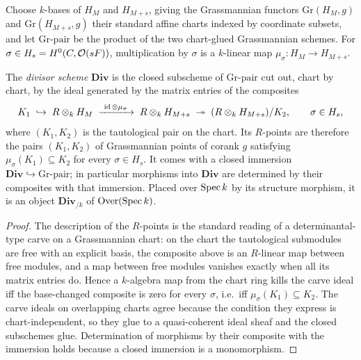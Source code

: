 \begin{definition}
  \label{pa-def:divScheme}
  \leanok

  Choose \(k\)-bases of \(H_M\) and \(H_{M+s}\), giving the Grassmannian functors
  \(\mathrm{Gr}(H_M, g)\) and \(\mathrm{Gr}(H_{M+s}, g)\) their standard affine charts
  indexed by coordinate subsets, and let \(\mathrm{Gr}\text{-pair}\) be the product of the
  two chart-glued Grassmannian schemes. For \(\sigma \in H_s = H^0(C, \mathcal{O}(sF))\), multiplication
  by \(\sigma\) is a \(k\)-linear map \(\mu_\sigma \colon H_M \to H_{M+s}\).

  The \emph{divisor scheme} \(\mathbf{Div}\) is the closed subscheme of
  \(\mathrm{Gr}\text{-pair}\) cut out, chart by chart, by the ideal generated by the matrix
  entries of the composites
  \[
    K_1 \;\hookrightarrow\; R \otimes_k H_M \;\xrightarrow{\ \operatorname{id} \otimes \mu_\sigma\ }\;
      R \otimes_k H_{M+s} \;\twoheadrightarrow\; (R \otimes_k H_{M+s})/K_2 ,
    \qquad \sigma \in H_s ,
  \]
  where \((K_1, K_2)\) is the tautological pair on the chart. Its \(R\)-points are therefore
  the pairs \((K_1, K_2)\) of Grassmannian points of corank \(g\) satisfying
  \(\mu_\sigma(K_1) \subseteq K_2\) for every \(\sigma \in H_s\). It comes with a closed
  immersion \(\mathbf{Div} \hookrightarrow \mathrm{Gr}\text{-pair}\); in particular
  morphisms into \(\mathbf{Div}\) are determined by their composites with that immersion.
  Placed over \(\operatorname{Spec} k\) by its structure morphism, it is an object
  \(\mathbf{Div}_{/k}\) of \(\mathrm{Over}(\operatorname{Spec} k)\).
\end{definition}
\begin{proof}
  \leanok
  The description of the \(R\)-points is the standard reading of a determinantal-type carve
  on a Grassmannian chart: on the chart the tautological submodules are free with an
  explicit basis, the composite above is an \(R\)-linear map between free modules, and a map
  between free modules vanishes exactly when all its matrix entries do. Hence a \(k\)-algebra
  map from the chart ring kills the carve ideal iff the base-changed composite is zero for
  every \(\sigma\), i.e.\ iff \(\mu_\sigma(K_1) \subseteq K_2\). The carve ideals on
  overlapping charts agree because the condition they express is chart-independent, so they
  glue to a quasi-coherent ideal sheaf and the closed subschemes glue. Determination of
  morphisms by their composite with the immersion holds because a closed immersion is a
  monomorphism.
\end{proof}

